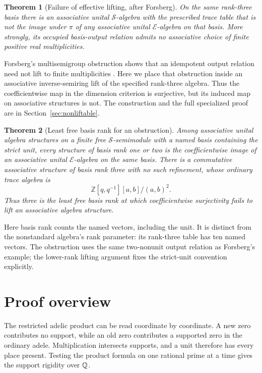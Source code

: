 \documentclass[11pt]{article}
\newtheorem{theorem}{Theorem}[section]\newtheorem{proposition}[theorem]{Proposition}
\theoremstyle{definition}\newtheorem{definition}[theorem]{Definition}
\begin{document}
\begin{theorem}[Failure of effective lifting, after Forsberg]\label{thm:nonliftable-main}
On the same rank-three basis there is an associative unital $\mathcal S$-algebra with the prescribed trace table that is not the image under $\pi$ of any associative unital $\mathcal E$-algebra on that basis. More strongly, its occupied basis-output relation admits no associative choice of finite positive real multiplicities.
\end{theorem}

Forsberg's multisemigroup obstruction shows that an idempotent output relation need not lift to finite multiplicities \citep[Proposition 12 and Corollary 13]{Forsberg}. Here we place that obstruction inside an associative inverse-semiring lift of the specified rank-three algebra. Thus the coefficientwise map in the dimension criterion is surjective, but its induced map on associative structures is not. The construction and the full specialized proof are in Section~\ref{sec:nonliftable}.

\begin{theorem}[Least free basis rank for an obstruction]\label{thm:minimal-basis-rank-main}
Among associative unital algebra structures on a finite free $\mathcal S$-semimodule with a named basis containing the strict unit, every structure of basis rank one or two is the coefficientwise image of an associative unital $\mathcal E$-algebra on the same basis. There is a commutative associative structure of basis rank three with no such refinement, whose ordinary trace algebra is
\[
 \mathbb Z[q,q^{-1}][a,b]/(a,b)^2.
\]
Thus three is the least free basis rank at which coefficientwise surjectivity fails to lift an associative algebra structure.
\end{theorem}

Here basis rank counts the named vectors, including the unit. It is distinct from the nonstandard algebra's rank parameter: its rank-three table has ten named vectors. The obstruction uses the same two-nonunit output relation as Forsberg's example; the lower-rank lifting argument fixes the strict-unit convention explicitly.



\section{Proof overview}
The restricted adelic product can be read coordinate by coordinate. A new zero contributes no support, while an old zero contributes a supported zero in the ordinary adele. Multiplication intersects supports, and a unit therefore has every place present. Testing the product formula on one rational prime at a time gives the support rigidity over $\mathbb Q$.
\end{document}
